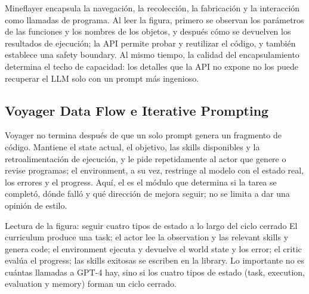 
Mineflayer encapsula la navegación, la recolección, la fabricación y la interacción como llamadas de programa. Al leer la figura, primero se observan los parámetros de las funciones y los nombres de los objetos, y después cómo se devuelven los resultados de ejecución; la API permite probar y reutilizar el código, y también establece una safety boundary. Al mismo tiempo, la calidad del encapsulamiento determina el techo de capacidad: los detalles que la API no expone no los puede recuperar el LLM solo con un prompt más ingenioso.


\subsection{Voyager Data Flow e Iterative Prompting}

Voyager no termina después de que un solo prompt genera un fragmento de código. Mantiene el state actual, el objetivo, las skills disponibles y la retroalimentación de ejecución, y le pide repetidamente al actor que genere o revise programas; el environment, a su vez, restringe al modelo con el estado real, los errores y el progress. Aquí, el  es el módulo que determina si la tarea se completó, dónde falló y qué dirección de mejora seguir; no se limita a dar una opinión de estilo.


\begin{knowledgebox}{Lectura de la figura: seguir cuatro tipos de estado a lo largo del ciclo cerrado}
El curriculum produce una task; el actor lee la observation y las relevant skills y genera code; el environment ejecuta y devuelve el world state y los error; el critic evalúa el progress; las skills exitosas se escriben en la library. Lo importante no es cuántas llamadas a GPT-4 hay, sino si los cuatro tipos de estado (task, execution, evaluation y memory) forman un ciclo cerrado.
\end{knowledgebox}

